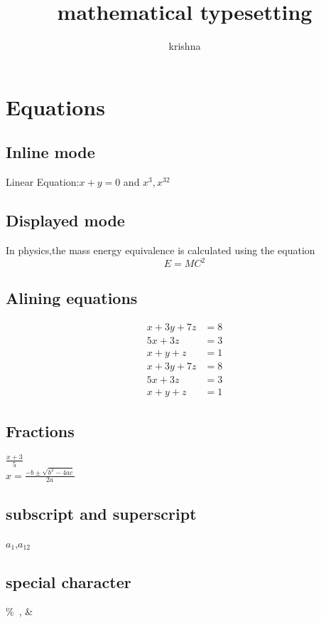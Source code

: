 \documentclass[12pt,openany]{book}
\begin{document}
	\title{mathematical typesetting}
	\author{krishna}
	\maketitle
	\chapter{Equations}
	\section{Inline mode}
	Linear Equation:$x+y=0$ and $x^3,x^{32}$
	\section{Displayed mode}
	In physics,the mass energy equivalence is calculated using the equation 
	\begin{equation}
		E=MC^2
	\end{equation}
	\section{Alining equations}
	\begin{align}
		x+3y+7z&=8\\
		5x+3z&=3 \nonumber\\
		x+y+z&=1
	\end{align}
	\begin{align*}
	x+3y+7z&=8\\
	5x+3z&=3\\
	x+y+z&=1
	\end{align*}
	\section{Fractions}
	$\displaystyle\frac{x+3}{5}$ \\
	$\displaystyle x=\frac{-b\pm\sqrt{b^2-4ac}}{2a}$\\
	\section{subscript and superscript}
	$a_1$,$a_{12}$
	\section{special character}
	\%\ , \&\
\end{document}
